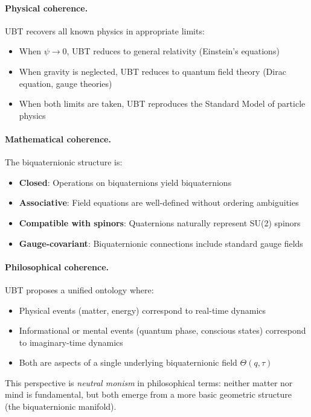 \paragraph{Physical coherence.} UBT recovers all known physics in appropriate limits:
\begin{itemize}
\item When $\psi \to 0$, UBT reduces to general relativity (Einstein's equations)
\item When gravity is neglected, UBT reduces to quantum field theory (Dirac equation, gauge theories)
\item When both limits are taken, UBT reproduces the Standard Model of particle physics
\end{itemize}

\paragraph{Mathematical coherence.} The biquaternionic structure is:
\begin{itemize}
\item \textbf{Closed}: Operations on biquaternions yield biquaternions
\item \textbf{Associative}: Field equations are well-defined without ordering ambiguities
\item \textbf{Compatible with spinors}: Quaternions naturally represent SU(2) spinors
\item \textbf{Gauge-covariant}: Biquaternionic connections include standard gauge fields
\end{itemize}

\paragraph{Philosophical coherence.} UBT proposes a unified ontology where:
\begin{itemize}
\item Physical events (matter, energy) correspond to real-time dynamics
\item Informational or mental events (quantum phase, conscious states) correspond to imaginary-time dynamics
\item Both are aspects of a single underlying biquaternionic field $\Theta(q,\tau)$
\end{itemize}

This perspective is \emph{neutral monism} in philosophical terms: neither matter nor mind is fundamental, but both emerge from a more basic geometric structure (the biquaternionic manifold).

